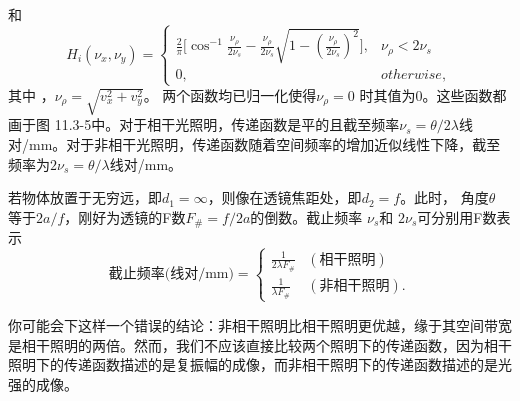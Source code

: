 \documentclass[UTF8]{ctexart}
\newcommand\crule[3][black]{\textcolor{#1}{\rule{#2}{#3}}}
\numberwithin{figure}{subsection}
\numberwithin{table}{subsection}
\begin{document}
和
\begin{equation}
H_i (\nu_x, \nu_y) =
\begin{cases}
\frac{2}{\pi} \Big[\cos^{-1} \frac{\nu_\rho}{2\nu_s} -  \frac{\nu_\rho}{2\nu_s} \sqrt{1 - ( \frac{\nu_\rho}{2\nu_s})^2} \Big], & \nu_\rho < 2\nu_s \\
0, & otherwise,
\end{cases}
\end{equation}
其中 ，$\nu_\rho = \sqrt{v_x^2 + v_y^2}$。 两个函数均已归一化使得$\nu_\rho = 0$ 时其值为0。这些函数都画于图 11.3-5中。对于相干光照明，传递函数是平的且截至频率$\nu_s = \theta / 2 \lambda$线对/mm。对于非相干光照明，传递函数随着空间频率的增加近似线性下降，截至频率为$2\nu_s = \theta / \lambda$线对/mm。
\par 若物体放置于无穷远，即$d_1 = \infty$，则像在透镜焦距处，即$d_2 = f$。此时， 角度$\theta$ 等于$2a / f$，刚好为透镜的F数$F_\# = f / 2a$的倒数。截止频率 $\nu_s$和 $2\nu_s$可分别用F数表示
\begin{equation}
\text{截止频率(线对/mm)} =
\begin{cases}
\frac{1}{2 \lambda F_\#} & (\text{相干照明}) \\
\frac{1}{\lambda F_\#} & (\text{非相干照明}) .
\end{cases}
\end{equation}
\par 你可能会下这样一个错误的结论：非相干照明比相干照明更优越，缘于其空间带宽是相干照明的两倍。然而，我们不应该直接比较两个照明下的传递函数，因为相干照明下的传递函数描述的是复振幅的成像，而非相干照明下的传递函数描述的是光强的成像。\\
\noindent{\crule[ksc]{\textwidth}{0.1cm}}

\bigbreak\begingroup
\color{ksc}
\end{document}

